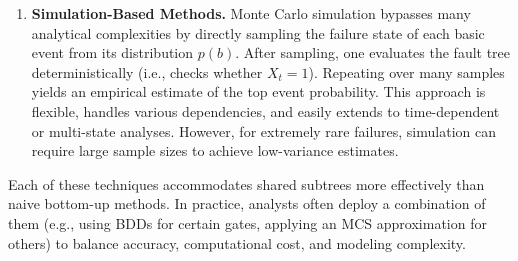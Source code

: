 \begin{enumerate}
  \item \textbf{Simulation-Based Methods.}  
  Monte Carlo simulation bypasses many analytical complexities by directly sampling the failure state of each basic event from its distribution \(p(b)\).  After sampling, one evaluates the fault tree deterministically (i.e., checks whether \(X_t=1\)).  Repeating over many samples yields an empirical estimate of the top event probability.  This approach is flexible, handles various dependencies, and easily extends to time-dependent or multi-state analyses.  However, for extremely rare failures, simulation can require large sample sizes to achieve low-variance estimates.

\end{enumerate}

Each of these techniques accommodates shared subtrees more effectively than naive bottom-up methods.  In practice, analysts often deploy a combination of them (e.g., using BDDs for certain gates, applying an MCS approximation for others) to balance accuracy, computational cost, and modeling complexity.